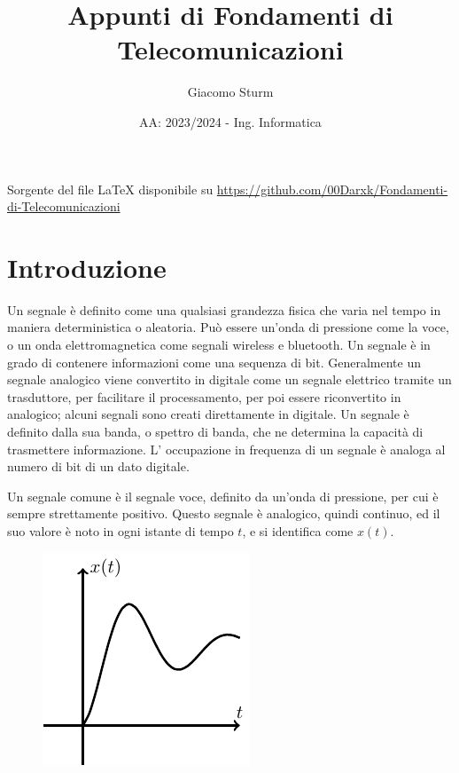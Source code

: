 \documentclass{article}
\title{Appunti di Fondamenti di Telecomunicazioni}
\author{Giacomo Sturm}
\date{AA: 2023/2024 - Ing. Informatica}
\numberwithin{equation}{subsection}
\begin{document}

\pagestyle{fancy}
\fancyhead{}\fancyfoot{}
\fancyfoot[C]{\thepage}

\maketitle

\vspace{10mm}

\begin{center}
    Sorgente del file LaTeX disponibile su \url{https://github.com/00Darxk/Fondamenti-di-Telecomunicazioni}
\end{center}

\clearpage

\tableofcontents

\clearpage



\section{Introduzione}

Un segnale è definito come una qualsiasi grandezza fisica che varia nel tempo in maniera deterministica o aleatoria. Può essere un'onda di pressione come la voce, o un onda 
elettromagnetica come segnali wireless e bluetooth. Un segnale è in grado di contenere informazioni come una sequenza di bit. Generalmente un segnale 
analogico viene convertito in digitale come un segnale elettrico tramite un trasduttore, per facilitare il processamento, per poi essere riconvertito in analogico; alcuni 
segnali sono creati direttamente in digitale. Un segnale è definito dalla sua banda, o spettro di banda, che ne determina la capacità di trasmettere informazione. L' 
occupazione in frequenza di un segnale è analoga al numero di bit di un dato digitale. 



Un segnale comune è il segnale voce, definito da un'onda di pressione, per cui è sempre strettamente positivo. Questo segnale è analogico, quindi continuo, ed il suo valore è 
noto in ogni istante di tempo $t$, e si identifica come $x(t)$. 

\begin{figure}[H]%
    \centering
    \includegraphics{segnale-continuo-1.pdf}%
    \label{fig:segnale-continuo-1}
\end{figure}
\end{document}
